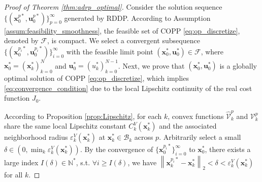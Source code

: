 \documentclass[journal]{IEEEtran}
\theoremstyle{definition}
\theoremstyle{definition}
\newcommand\norm[2][1]{\left\|#2\right\|_{#1}}
\newcommand\N{{\mathbb{N}}}
\renewcommand\vector[1]{\boldsymbol{#1}}
\newcommand\vx{{\vector{x}}}
\newcommand\bx{{\mathbf{x}}}
\newcommand\bu{{\mathbf{u}}}
\begin{document}
\begin{proof}[Proof of Theorem \ref{thm:adrp_optimal}]
    Consider the solution sequence $\{(\bx_0^{p*},\bu_0^{p*})\}_{p=0}^\infty$ generated by RDDP. According to Assumption \ref{assum:feasibility_smoothness}, the feasible set of COPP \eqref{eq:op_discretize}, denoted by $\mathcal{F}$, is compact. We select a convergent subsequence $\{(\bx_0^{p_i*},\bu_0^{p_i*})\}_{i=0}^\infty$ with the feasible limit point $(\bx_0^*,\bu_0^*)\in\mathcal{F}$, where $\bx_0^*=(\vx_k^*)_{k=0}^N$ and $\bu_0^*=(u_k^*)_{k=0}^{N-1}$. Next, we prove that $(\bx_0^*,\bu_0^*)$ is a globally optimal solution of COPP \eqref{eq:op_discretize}, which implies \eqref{eq:convergence_condition} due to the local Lipschitz continuity of the real cost function $J_0$.

    According to Proposition \ref{prop:Lipschitz}, for each $k$, convex functions $\widehat{\mathcal{V}}_k^p$ and $\mathcal{V}_k^p$ share the same local Lipschitz constant $C_k^V(\vx_k^*)$ and the associated neighborhood radius $\varepsilon_k^V(\vx_k^*)$ at $\vx_k^*\in\mathcal{B}_k$ across $p$. Arbitrarily select a small $\delta\in(0,\min_{k}\varepsilon_k^V(\vx_k^*))$. By the convergence of $\{\bx_0^{p_i*}\}_{i=0}^\infty$ to $\bx_0^*$, there exists a large index $I(\delta)\in\N^*$, s.t. $\forall i\geq I(\delta)$, we have $\norm[2]{\vx_k^{p_i*}-\vx_k^*}<\delta<\varepsilon_k^V(\vx_k^*)$ for all $k$.


\end{proof}
\end{document}
